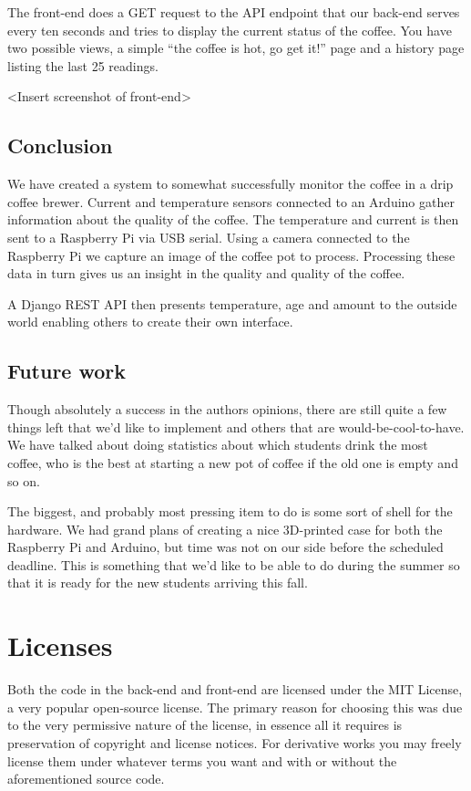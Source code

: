 \documentclass[12pt,a4paper,oneside,article]{memoir}
\numberwithin{equation}{chapter}
\begin{document}
The front-end does a GET request to the API endpoint that our back-end serves
every ten seconds and tries to display the current status of the coffee. You
have two possible views, a simple ``the coffee is hot, go get it!'' page and a
history page listing the last 25 readings.

<Insert screenshot of front-end>

\section{Conclusion}\label{sec:conclusion}
We have created a system to somewhat successfully monitor the coffee in a
drip coffee brewer. %
Current and temperature sensors connected to an Arduino gather information about
the quality of the coffee. The temperature and current is then sent to a 
Raspberry Pi via USB serial. Using a camera connected to the Raspberry Pi we 
capture an image of the coffee pot to process. Processing these data in 
turn gives us an insight in the quality and quality of the coffee.

A Django REST API then presents temperature, age and amount to the outside 
world enabling others to create their own interface. 

\section{Future work}\label{sec:future-work}
Though absolutely a success in the authors opinions, there are still quite a few
things left that we'd like to implement and others that are
would-be-cool-to-have. We have talked about doing statistics about which
students drink the most coffee, who is the best at starting a new pot of coffee
if the old one is empty and so on.

The biggest, and probably most pressing item to do is some sort of shell for the
hardware. We had grand plans of creating a nice 3D-printed case for both the
Raspberry Pi and Arduino, but time was not on our side before the scheduled
deadline. This is something that we'd like to be able to do during the summer so
that it is ready for the new students arriving this fall.

\clearpage
\appendix
\chapter{Licenses}\label{sec:licenses}
Both the code in the back-end and front-end are licensed under the MIT License,
a very popular open-source license. The primary reason for choosing this was due
to the very permissive nature of the license, in essence all it requires is
preservation of copyright and license notices. For derivative works you may
freely license them under whatever terms you want and with or without the
aforementioned source code.
\end{document}
